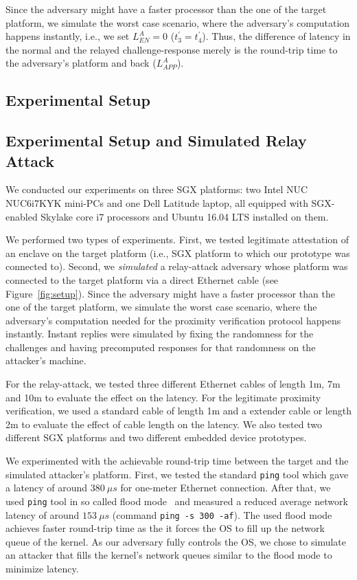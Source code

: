 Since the adversary might have a faster processor than the one of the target platform, we simulate the worst case scenario, where the adversary's computation happens instantly, i.e., we set $L_{EN}^A=0$ ($t_{3}^\prime=t_{4}^\prime$).
%
Thus, the difference of latency in the normal and the relayed challenge-response merely is the round-trip time to the adversary's platform and back ($L_{APP}^A$).
\fi

\ifusenix
\subsection{Experimental Setup}
\else
\subsection{Experimental Setup and Simulated Relay Attack}
\fi
\label{sec:evaluation:exp}

We conducted our experiments on three SGX platforms: two Intel NUC NUC6i7KYK mini-PCs and one Dell Latitude laptop, all equipped with SGX-enabled Skylake core i7 processors and Ubuntu 16.04 LTS installed on them.

We performed two types of experiments. First, we tested legitimate attestation of an enclave on the target platform (i.e., SGX platform to which our \device prototype was connected to). Second, we \emph{simulated} a relay-attack adversary whose platform was connected to the target platform via a direct Ethernet cable (see Figure~\ref{fig:setup}). Since the adversary might have a faster processor than the one of the target platform, we simulate the worst case scenario, where the adversary's computation needed for the proximity verification protocol happens instantly. Instant replies were simulated by fixing the randomness for the challenges and having precomputed responses for that randomness on the attacker's machine. 


For the relay-attack, we tested three different Ethernet cables of length 1m, 7m and 10m to evaluate the effect on the latency. For the legitimate proximity verification, we used a standard \usb cable of length 1m and a \usb extender cable or length 2m to evaluate the effect of \usb cable length on the latency. We also tested two different SGX platforms and two different embedded device prototypes.

We experimented with the achievable round-trip time between the target and the simulated attacker's platform. First, we tested the standard \texttt{ping} tool which gave a latency of around $380\ \mu s$ for one-meter Ethernet connection. After that, we used \texttt{ping} tool in so called flood mode~\cite{ping} and measured a reduced average network latency of around $153\ \mu s$ (command \texttt{ping -s 300 -af}). The used flood mode achieves faster round-trip time as the it forces the OS to fill up the network queue of the kernel. As our adversary fully controls the OS, we chose to simulate an attacker that fills the kernel's network queues similar to the flood mode to minimize latency.


